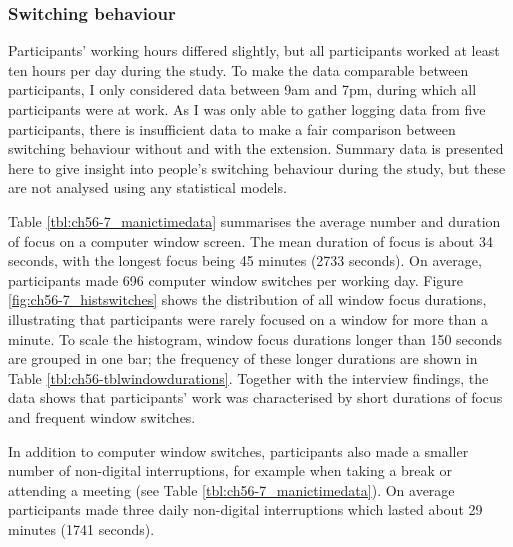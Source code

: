 \subsubsection{Switching behaviour}
Participants’ working hours differed slightly, but all participants worked at least ten hours per day during the study. To make the data comparable between participants, I only considered data between 9am and 7pm, during which all participants were at work. As I was only able to gather logging data from five participants, there is insufficient data to make a fair comparison between switching behaviour without and with the extension. Summary data is presented here to give insight into people's switching behaviour during the study, but these are not analysed using any statistical models.

Table \ref{tbl:ch56-7_manictimedata} summarises the average number and duration of focus on a computer window screen. The mean duration of focus is about 34 seconds, with the longest focus being 45 minutes (2733 seconds). On average, participants made 696  computer window switches per working day. Figure \ref{fig:ch56-7_histswitches} shows the distribution of all window focus durations, illustrating that participants were rarely focused on a window for more than a minute. To scale the histogram, window focus durations longer than 150 seconds are grouped in one bar; the frequency of these longer durations are shown in Table \ref{tbl:ch56-tblwindowdurations}. %
Together with the interview findings, the data shows that participants’ work was characterised by short durations of focus and frequent window switches. %

In addition to computer window switches, participants also made a smaller number of non-digital interruptions, for example when taking a break or attending a meeting (see Table \ref{tbl:ch56-7_manictimedata}). On average participants made three daily non-digital interruptions which lasted about 29 minutes (1741 seconds). 


